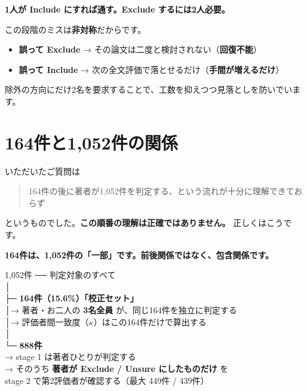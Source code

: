\documentclass[a4paper]{ltjsarticle}
\newcommand{\keybox}[1]{%
  \par\medskip
  \noindent\colorbox{soft}{%
    \begin{minipage}{\dimexpr\linewidth-2\fboxsep\relax}
      \vspace{2pt}\centering\bfseries\large #1\vspace{4pt}
    \end{minipage}}%
  \par\medskip}
\begin{document}
\keybox{1人が Include にすれば通す。Exclude するには2人必要。}

\noindent
この段階のミスは\textbf{非対称}だからです。

\begin{itemize}
  \item \textbf{誤って Exclude} → その論文は二度と検討されない（\textbf{回復不能}）
  \item \textbf{誤って Include} → 次の全文評価で落とせるだけ（\textbf{手間が増えるだけ}）
\end{itemize}

\noindent
除外の方向にだけ2名を要求することで、工数を抑えつつ見落としを防いでいます。

\section{164件と1,052件の関係}

いただいたご質問は

\begin{quote}
164件の後に著者が1,052件を判定する、という流れが十分に理解できておらず
\end{quote}

\noindent
というものでした。\textbf{この順番の理解は正確ではありません。} 正しくはこうです。

\keybox{164件は、1,052件の「一部」です。前後関係ではなく、包含関係です。}

\begin{center}
\begin{minipage}{0.95\linewidth}
\ttfamily\small
1,052件 ── 判定対象のすべて\\
\hspace*{2.0em}│\\
\hspace*{2.0em}├─ \textbf{164件（15.6\%）「校正セット」}\\
\hspace*{2.0em}│\hspace*{2.2em}→ 著者・お二人の \textbf{3名全員} が、同じ164件を独立に判定する\\
\hspace*{2.0em}│\hspace*{2.2em}→ 評価者間一致度（$\kappa$）はこの164件だけで算出する\\
\hspace*{2.0em}│\\
\hspace*{2.0em}└─ \textbf{888件}\\
\hspace*{4.6em}→ stage 1 は著者ひとりが判定する\\
\hspace*{4.6em}→ そのうち \textbf{著者が Exclude / Unsure にしたものだけ} を\\
\hspace*{6.6em}stage 2 で第2評価者が確認する（最大 449件 / 439件）
\end{minipage}
\end{center}
\end{document}
